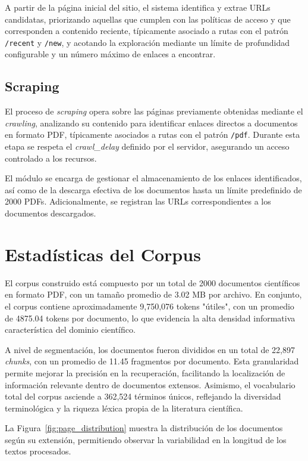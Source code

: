 \documentclass[runningheads]{llncs}
\begin{document}
A partir de la página inicial del sitio, el sistema identifica y extrae URLs candidatas,
priorizando aquellas que cumplen con las políticas de acceso y que corresponden a contenido reciente,
típicamente asociado a rutas con el patrón \texttt{/recent} y \texttt{/new}, 
y acotando la exploración mediante un límite de profundidad configurable y un número máximo de enlaces a encontrar.

\subsection{Scraping}

El proceso de \textit{scraping} opera sobre las páginas previamente obtenidas mediante el \textit{crawling}, 
analizando su contenido para identificar enlaces directos a documentos en formato PDF, 
típicamente asociados a rutas con el patrón \texttt{/pdf}. 
Durante esta etapa se respeta el \textit{crawl\_delay} definido por el servidor, 
asegurando un acceso controlado a los recursos.

El módulo se encarga de gestionar el almacenamiento de los enlaces identificados, 
así como de la descarga efectiva de los documentos hasta un límite predefinido de 2000 PDFs. 
Adicionalmente, se registran las URLs correspondientes a los documentos descargados.

\section{Estadísticas del Corpus}

El corpus construido está compuesto por un total de 2000 documentos científicos en formato PDF, 
con un tamaño promedio de 3.02 MB por archivo. 
En conjunto, el corpus contiene aproximadamente 9,750,076 tokens "útiles", con un promedio de 4875.04 tokens por documento, 
lo que evidencia la alta densidad informativa característica del dominio científico.

A nivel de segmentación, los documentos fueron divididos en un total de 22,897 \textit{chunks}, 
con un promedio de 11.45 fragmentos por documento. 
Esta granularidad permite mejorar la precisión en la recuperación, 
facilitando la localización de información relevante dentro de documentos extensos. 
Asimismo, el vocabulario total del corpus asciende a 362,524 términos únicos, 
reflejando la diversidad terminológica y la riqueza léxica propia de la literatura científica.

La Figura~\ref{fig:page_distribution} muestra la distribución de los documentos según su extensión, 
permitiendo observar la variabilidad en la longitud de los textos procesados.
\end{document}
